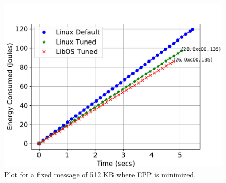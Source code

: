 \begin{figure}[t]
  \includegraphics[width=\columnwidth]{osdi_figures/netpipe_524288_epp.pdf}
  \caption{Plot for a fixed message of 512 KB where EPP is minimized.}
  \label{fig:netpipe524288epp}
\end{figure}

